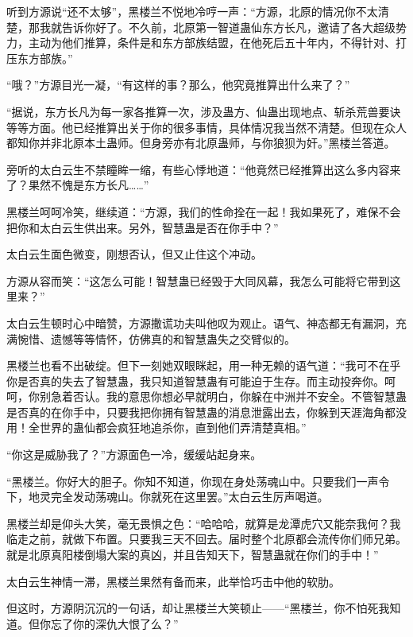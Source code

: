 
\begin{this_body}

听到方源说“还不太够”，黑楼兰不悦地冷哼一声：“方源，北原的情况你不太清楚，那我就告诉你好了。不久前，北原第一智道蛊仙东方长凡，邀请了各大超级势力，主动为他们推算，条件是和东方部族结盟，在他死后五十年内，不得针对、打压东方部族。”

“哦？”方源目光一凝，“有这样的事？那么，他究竟推算出什么来了？”

“据说，东方长凡为每一家各推算一次，涉及蛊方、仙蛊出现地点、斩杀荒兽要诀等等方面。他已经推算出关于你的很多事情，具体情况我当然不清楚。但现在众人都知你并非北原本土蛊师。但身旁亦有北原蛊师，与你狼狈为奸。”黑楼兰答道。

旁听的太白云生不禁瞳眸一缩，有些心悸地道：“他竟然已经推算出这么多内容来了？果然不愧是东方长凡……”

黑楼兰呵呵冷笑，继续道：“方源，我们的性命拴在一起！我如果死了，难保不会把你和太白云生供出来。另外，智慧蛊是否在你手中？”

太白云生面色微变，刚想否认，但又止住这个冲动。

方源从容而笑：“这怎么可能！智慧蛊已经毁于大同风幕，我怎么可能将它带到这里来？”

太白云生顿时心中暗赞，方源撒谎功夫叫他叹为观止。语气、神态都无有漏洞，充满惋惜、遗憾等等情怀，仿佛真的和智慧蛊失之交臂似的。

黑楼兰也看不出破绽。但下一刻她双眼眯起，用一种无赖的语气道：“我可不在乎你是否真的失去了智慧蛊，我只知道智慧蛊有可能迫于生存。而主动投奔你。呵呵，你别急着否认。我的意思你想必早就明白，你躲在中洲并不安全。不管智慧蛊是否真的在你手中，只要我把你拥有智慧蛊的消息泄露出去，你躲到天涯海角都没用！全世界的蛊仙都会疯狂地追杀你，直到他们弄清楚真相。”

“你这是威胁我了？”方源面色一冷，缓缓站起身来。

“黑楼兰。你好大的胆子。你知不知道，你现在身处荡魂山中。只要我们一声令下，地灵完全发动荡魂山。你就死在这里罢。”太白云生厉声喝道。

黑楼兰却是仰头大笑，毫无畏惧之色：“哈哈哈，就算是龙潭虎穴又能奈我何？我临走之前，就做下布置。只要我三天不回去。届时整个北原都会流传你们师兄弟。就是北原真阳楼倒塌大案的真凶，并且告知天下，智慧蛊就在你们的手中！”

太白云生神情一滞，黑楼兰果然有备而来，此举恰巧击中他的软肋。

但这时，方源阴沉沉的一句话，却让黑楼兰大笑顿止——“黑楼兰，你不怕死我知道。但你忘了你的深仇大恨了么？”


\end{this_body}

